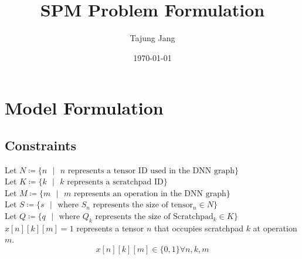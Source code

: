 \documentclass{article}
\title{SPM Problem Formulation} \author{Tajung Jang}
\date\today
\begin{document}
\maketitle %

\section{Model Formulation}
\subsection{Constraints}
Let $N \coloneqq \{ n \text{ }  | \text{ } n   \text{ represents a tensor ID used in the DNN graph}\}$\\
Let $K \coloneqq \{ k \text{ }  | \text{ } k   \text{ represents a scratchpad ID}\}$\\
Let $M \coloneqq \{ m \text{ }  | \text{ } m   \text{ represents an operation in the DNN graph}\}$\\
Let $S \coloneqq \{ s \text{ }| \text{ } \text{where } S_n \text{ represents the size of tensor$_n \in N$}\}$\\
Let $Q \coloneqq \{ q \text{ }| \text{ } \text{where } Q_k \text{ represents the size of Scratchpad$_k \in K$}\}$\\

$x[n][k][m] = 1$ represents a tensor $n$ that occupies scratchpad $k$ at operation $m$.\\

\[
x[n][k][m] \in \{0, 1\} \forall n,k,m
\]
\end{document}
